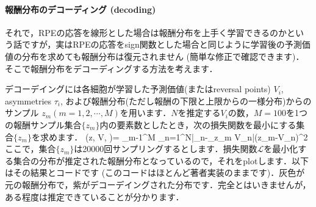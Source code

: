\paragraph{報酬分布のデコーディング (decoding)}
それで，RPEの応答を線形とした場合は報酬分布を上手く学習できるのかという話ですが，実はRPEの応答をsign関数とした場合と同じように学習後の予測価値の分布を求めても報酬分布は復元されません (簡単な修正で確認できます)．そこで報酬分布をデコーディングする方法を考えます．

デコーデイングには各細胞が学習した予測価値(またはreversal points) $V_i$, asymmetries $\tau_i$, および報酬分布(ただし報酬の下限と上限からの一様分布)からのサンプル $z_m (m=1,2,\cdots,
M)$を用います．$N$を推定する$V_i$の数，$M=100$を1つの報酬サンプル集合$\{z_m\}$内の要素数としたとき，次の損失関数を最小にする集合$\{z_m\}$を求めます．  (z, V, \tau)= \sum_{m-1}^{M} \sum_{n=1}^{N}\left|\tau_{n}-_{z_{m} \leq
V_{n}}\right|\left(z_{m}-V_{n}\right)^{2}  ここで，集合$\{z_m\}$は20000回サンプリングするとします．損失関数$\mathcal{L}$を最小化する集合の分布が推定された報酬分布となっているので，それをplotします．以下はその結果とコードです
(このコードはほとんど著者実装のままです)．灰色が元の報酬分布で，紫がデコーデイングされた分布です．完全とはいきませんが，ある程度は推定できていることが分かります．

